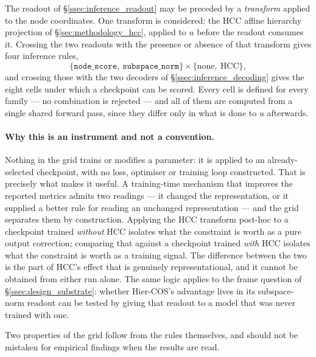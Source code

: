The readout of \S\ref{ssec:inference_readout} may be preceded by a
\emph{transform} applied to the node coordinates. One transform is considered: the
HCC affine hierarchy projection of \S\ref{sec:methodology_hcc}, applied to $u$
before the readout consumes it. Crossing the two readouts with the presence or
absence of that transform gives four inference rules,
\[
\big\{\texttt{node\_score},\ \texttt{subspace\_norm}\big\}
\times
\big\{\text{none},\ \text{HCC}\big\},
\]
and crossing those with the two decoders of \S\ref{ssec:inference_decoding} gives
the eight cells under which a checkpoint can be scored. Every cell is defined for
every family --- no combination is rejected --- and all of them are computed from
a single shared forward pass, since they differ only in what is done to $u$
afterwards.

\paragraph{Why this is an instrument and not a convention.} Nothing in the grid
trains or modifies a parameter: it is applied to an already-selected checkpoint,
with no loss, optimiser or training loop constructed. That is precisely what makes
it useful. A training-time mechanism that improves the reported metrics admits two
readings --- it changed the representation, or it supplied a better rule for
reading an unchanged representation --- and the grid separates them by
construction. Applying the HCC transform post-hoc to a checkpoint trained
\emph{without} HCC isolates what the constraint is worth as a pure output
correction; comparing that against a checkpoint trained \emph{with} HCC isolates
what the constraint is worth as a training signal. The difference between the two
is the part of HCC's effect that is genuinely representational, and it cannot be
obtained from either run alone. The same logic applies to the frame question of
\S\ref{ssec:design_substrate}: whether Hier-COS's advantage lives in its
subspace-norm readout can be tested by giving that readout to a model that was
never trained with one.

Two properties of the grid follow from the rules themselves, and should not be
mistaken for empirical findings when the results are read.

